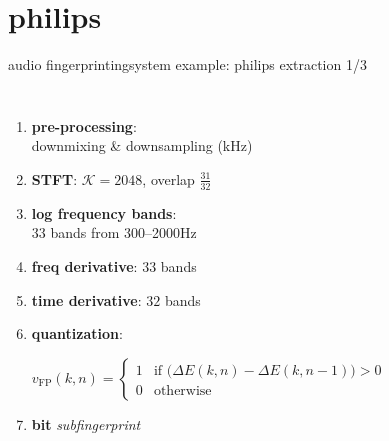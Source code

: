      \section{philips}   
        \begin{frame}{audio fingerprinting}{system example: philips extraction 1/3}
            \begin{footnotesize}
                \begin{columns}[T]
                        \scalebox{.75}
                        {
                            \centering
                            
                        }
                        \begin{enumerate}
                            \item<1->	\textbf{pre-processing}:\\ downmixing \& downsampling (\unit[5]{kHz})
                            \item<2->	\textbf{STFT}: $\mathcal{K}=2048$, overlap $\frac{31}{32}$
                            \item<3->	\textbf{log frequency bands}:\\ $33$ bands from 300--2000\unit{Hz}
                            \item<4->	\textbf{freq derivative}: $33$ bands
                            \item<4->	\textbf{time derivative}: $32$ bands
                            \item<5->	\textbf{quantization}: 
                                \begin{tiny}
                                    \begin{equation*}\label{eq:fingerprint}
                                        v_\mathrm{FP}(k,n)	= \begin{cases}
                                                        1 & \text{if } \big(\Delta{E}(k,n) - \Delta{E}(k,n-1)\big) > 0\\
                                                        0 & \text{otherwise}
                                                    \end{cases}\nonumber
                                    \end{equation*}
                                \end{tiny}

                            \item<6->[$\Rightarrow$]	\textbf{\unit[32]{bit}} \textit{subfingerprint}
                        \end{enumerate}
                \end{columns}
            \end{footnotesize}
        \end{frame}

